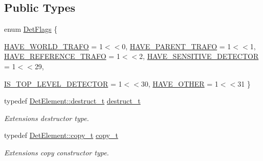 \subsection*{Public Types}
\begin{DoxyCompactItemize}
\item 
enum \hyperlink{class_d_d4hep_1_1_geometry_1_1_det_element_object_a04115ec0fa8d9df9b7d47ed45e9b037d}{DetFlags} \{ \par
\hyperlink{class_d_d4hep_1_1_geometry_1_1_det_element_object_a04115ec0fa8d9df9b7d47ed45e9b037dadeb5adca04d132e1d1a9dff4b4041378}{HAVE\_\-WORLD\_\-TRAFO} =  1$<$$<$0, 
\hyperlink{class_d_d4hep_1_1_geometry_1_1_det_element_object_a04115ec0fa8d9df9b7d47ed45e9b037da92cecd0c1ce2c726acd404dfc5dc6ed0}{HAVE\_\-PARENT\_\-TRAFO} =  1$<$$<$1, 
\hyperlink{class_d_d4hep_1_1_geometry_1_1_det_element_object_a04115ec0fa8d9df9b7d47ed45e9b037da5fb13dc50b7d71fdfb1539ef4f2ba2d9}{HAVE\_\-REFERENCE\_\-TRAFO} =  1$<$$<$2, 
\hyperlink{class_d_d4hep_1_1_geometry_1_1_det_element_object_a04115ec0fa8d9df9b7d47ed45e9b037da805055fa07991eced9a624194ea95c1c}{HAVE\_\-SENSITIVE\_\-DETECTOR} =  1$<$$<$29, 
\par
\hyperlink{class_d_d4hep_1_1_geometry_1_1_det_element_object_a04115ec0fa8d9df9b7d47ed45e9b037da7fc93a02de387e3a443e7f900157f2dd}{IS\_\-TOP\_\-LEVEL\_\-DETECTOR} =  1$<$$<$30, 
\hyperlink{class_d_d4hep_1_1_geometry_1_1_det_element_object_a04115ec0fa8d9df9b7d47ed45e9b037da81ef79f7722d59d01cb24098b3b4492b}{HAVE\_\-OTHER} =  1$<$$<$31
 \}
\item 
typedef \hyperlink{class_d_d4hep_1_1_geometry_1_1_det_element_abeb83026451009f114bf84c285aec3c7}{DetElement::destruct\_\-t} \hyperlink{class_d_d4hep_1_1_geometry_1_1_det_element_object_af4773c2a725fc7076297670a7ae1ac41}{destruct\_\-t}
\begin{DoxyCompactList}\small\item\em Extensions destructor type. \item\end{DoxyCompactList}\item 
typedef \hyperlink{class_d_d4hep_1_1_geometry_1_1_det_element_ad7efc067c799c81da218e8e153fb9fc9}{DetElement::copy\_\-t} \hyperlink{class_d_d4hep_1_1_geometry_1_1_det_element_object_a2780058563d2399014b51afa789ebd21}{copy\_\-t}
\begin{DoxyCompactList}\small\item\em Extensions copy constructor type. \item\end{DoxyCompactList}\item 

\end{DoxyCompactItemize}
